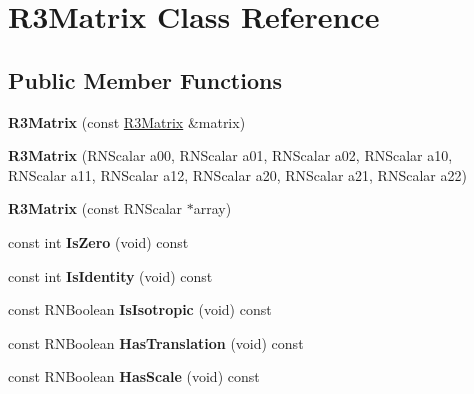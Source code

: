 \hypertarget{class_r3_matrix}{}\section{R3\+Matrix Class Reference}
\label{class_r3_matrix}
\subsection*{Public Member Functions}
\begin{DoxyCompactItemize}
\item 
{\bfseries R3\+Matrix} (const \hyperlink{class_r3_matrix}{R3\+Matrix} \&matrix)\hypertarget{class_r3_matrix_a83409b13cc8ff8803d4a9b4b764fdfb4}{}\label{class_r3_matrix_a83409b13cc8ff8803d4a9b4b764fdfb4}

\item 
{\bfseries R3\+Matrix} (R\+N\+Scalar a00, R\+N\+Scalar a01, R\+N\+Scalar a02, R\+N\+Scalar a10, R\+N\+Scalar a11, R\+N\+Scalar a12, R\+N\+Scalar a20, R\+N\+Scalar a21, R\+N\+Scalar a22)\hypertarget{class_r3_matrix_a547e15cf503b2b1f44a1ed58fe8af21b}{}\label{class_r3_matrix_a547e15cf503b2b1f44a1ed58fe8af21b}

\item 
{\bfseries R3\+Matrix} (const R\+N\+Scalar $\ast$array)\hypertarget{class_r3_matrix_a058aafb47d11fb533092c056328414bf}{}\label{class_r3_matrix_a058aafb47d11fb533092c056328414bf}

\item 
const int {\bfseries Is\+Zero} (void) const \hypertarget{class_r3_matrix_ac31565aac506d671a9e624ba4051acb0}{}\label{class_r3_matrix_ac31565aac506d671a9e624ba4051acb0}

\item 
const int {\bfseries Is\+Identity} (void) const \hypertarget{class_r3_matrix_a88d77400a75a67798d56c30f453a394f}{}\label{class_r3_matrix_a88d77400a75a67798d56c30f453a394f}

\item 
const R\+N\+Boolean {\bfseries Is\+Isotropic} (void) const \hypertarget{class_r3_matrix_a6cfef6a3bf1b018bd6983573c5372504}{}\label{class_r3_matrix_a6cfef6a3bf1b018bd6983573c5372504}

\item 
const R\+N\+Boolean {\bfseries Has\+Translation} (void) const \hypertarget{class_r3_matrix_a678d70209a04dbc56d32b0df99312e3d}{}\label{class_r3_matrix_a678d70209a04dbc56d32b0df99312e3d}

\item 
const R\+N\+Boolean {\bfseries Has\+Scale} (void) const \hypertarget{class_r3_matrix_a428edf9f7a7bc5ecc8c6147a553e7846}{}\label{class_r3_matrix_a428edf9f7a7bc5ecc8c6147a553e7846}


\end{DoxyCompactItemize}
